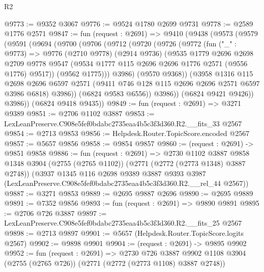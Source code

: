 \begin{lexlean}{R2}
\begin{coremodule}
@9773 := @9352 @3067
@9776 := @9524 @1780 @2699 @9731
@9778 := @2589 @1776 @2571
@9847 := fun (request : @2691) =>
  @9410
    (@9438
      (@9573
        (@9579
          (@9591
            (@9694
              (@9700
                (@9706
                  (@9712
                    (@9720
                      (@9726
                        (@9772
                          (fun ("_" : @9773) =>
                          @9776
                            (@2710 @9778)
                            (@2914 @9736)
                            (@9535
                              @1779
                              @2696
                              @2698
                              @2709
                              @9778
                              @9547
                              (@9534 @1777 @115 @2696 @2696 @1776 @2571 (@9556 @1776) @9517))
                            (@9562 @1775)))
                        @3986)
                      (@9570 @9368))
                    (@3958
                      @1316
                      @115
                      @2698
                      @2696
                      @6597
                      @2571
                      (@9411 @746 @128 @115 @2696 @2696 @2571 @6597 @3986 @6818)
                      @3986))
                  (@6824 @9583 @6556))
                @3986))
            (@6824 @9421 @9426))
          @3986))
      (@6824 @9418 @9435))
@9849 := fun (request : @2691) => @3271 @9389
@9851 := @2706 @1102 @3887
@9853 := LexLeanPreserve.C908e5fef0bdabc2735eaa4b5c3f3d360.R2.__fits_33 @2567
@9854 := @2713 @9853
@9856 := Helpdesk.Router.TopicScore.encoded @2567
@9857 := @5657 @9856
@9858 := @9854 @9857
@9860 := (request : @2691) -> @9851 @9858
@9886 := fun (request : @2691) =>
  @2730
    @1102
    @3887
    @9858
    @1348
    @3904
    (@2755 (@2765 @1102))
    (@2771 (@2772 (@2773 @1348) @3887 @2748))
    (@3937
      @1345
      @116
      @2698
      @9389
      @3887
      @9393
      @3987
      (LexLeanPreserve.C908e5fef0bdabc2735eaa4b5c3f3d360.R2.__rel_44 @2567))
@9887 := @3271 @9853
@9889 := @2695 @9887 @2696
@9890 := @2695 @9889
@9891 := @7352 @9856
@9893 := fun (request : @2691) => @9890 @9891
@9895 := @2706 @726 @3887
@9897 := LexLeanPreserve.C908e5fef0bdabc2735eaa4b5c3f3d360.R2.__fits_25 @2567
@9898 := @2713 @9897
@9901 := @5657 (Helpdesk.Router.TopicScore.logits @2567)
@9902 := @9898 @9901
@9904 := (request : @2691) -> @9895 @9902
@9952 := fun (request : @2691) =>
  @2730
    @726
    @3887
    @9902
    @1108
    @3904
    (@2755 (@2765 @726))
    (@2771 (@2772 (@2773 @1108) @3887 @2748))

\end{coremodule}
\end{lexlean}
